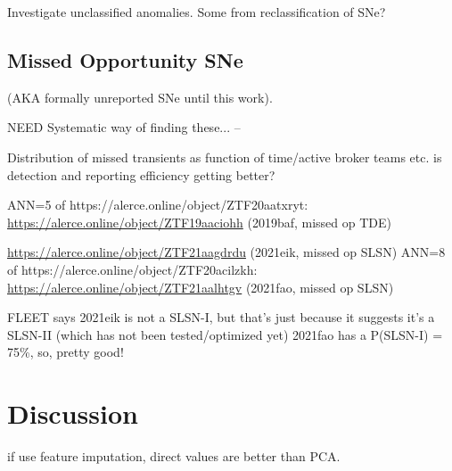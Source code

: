 \documentclass[twocolumn]{aastex63}
\begin{document}
Investigate unclassified anomalies. Some from reclassification of SNe?


\subsection{Missed Opportunity SNe}  \label{subsec:reclass_sne}

(AKA formally unreported SNe until this work).

NEED Systematic way of finding these...
    --

Distribution of missed transients as function of time/active broker teams etc. is detection and reporting efficiency getting better?



ANN=5 of https://alerce.online/object/ZTF20aatxryt: \url{https://alerce.online/object/ZTF19aaciohh} (2019baf, missed op TDE)


\url{https://alerce.online/object/ZTF21aagdrdu} (2021eik, missed op SLSN)
ANN=8 of https://alerce.online/object/ZTF20acilzkh: \url{https://alerce.online/object/ZTF21aalhtgv} (2021fao, missed op SLSN) 

 FLEET says 2021eik is not a SLSN-I, but that's just because it suggests it's a SLSN-II (which has not been tested/optimized yet)
2021fao has a P(SLSN-I) = 75\%, so, pretty good!


\section{Discussion} \label{sec:discussion}

if use feature imputation, direct values are better than PCA.


\end{document}
